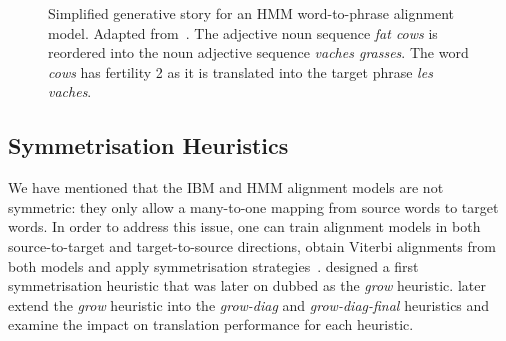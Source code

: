 \begin{figure}
  \begin{center}
  \end{center}
  \caption{Simplified generative story for an HMM word-to-phrase alignment model.
    Adapted from~\citep{deng-and-byrne:2008:ASLP}.
    The adjective noun sequence \emph{fat cows} is
    reordered into the noun adjective sequence \emph{vaches grasses}.
    The word \emph{cows} has fertility 2 as it is translated
    into the target phrase \emph{les vaches}.}
  \label{fig:wordtophrase}
\end{figure}

\subsection{Symmetrisation Heuristics}
\label{sec:symmetrisationHeuristics}

We have mentioned that the IBM and HMM alignment models
are not symmetric: they only allow a many-to-one mapping from
source words to target words.
In order to address this issue, one can train
alignment models in both source-to-target and target-to-source
directions, obtain Viterbi alignments from
both models and apply symmetrisation
strategies~\citep{och-tillmann-ney:1999:EMNLP,och-ney:2003:CL,koehn-och-marcu:2003:NAACL}.
\citet{och-tillmann-ney:1999:EMNLP} designed
a first symmetrisation heuristic that was later on dubbed
as the \emph{grow} heuristic. \citet{koehn-och-marcu:2003:NAACL}
later extend the \emph{grow} heuristic into
the \emph{grow-diag} and \emph{grow-diag-final} heuristics
and examine the impact on translation
performance for each heuristic.

